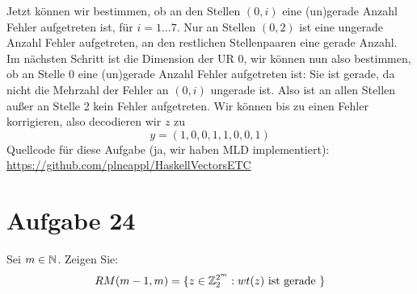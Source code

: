 Jetzt können wir bestimmen, ob an den Stellen $(0, i)$ eine (un)gerade Anzahl Fehler aufgetreten ist, für $i=1\ldots 7$. Nur an Stellen $(0, 2)$ ist eine ungerade Anzahl Fehler aufgetreten, an den restlichen Stellenpaaren eine gerade Anzahl.\\
Im nächsten Schritt ist die Dimension der UR 0, wir können nun also bestimmen, ob an Stelle 0 eine (un)gerade Anzahl Fehler aufgetreten ist: Sie ist gerade, da nicht die Mehrzahl der Fehler an $(0, i)$ ungerade ist. Also ist an allen Stellen außer an Stelle 2 kein Fehler aufgetreten. Wir können bis zu einen Fehler korrigieren, also decodieren wir $z$ zu $$y = (1, 0, 0, 1, 1, 0, 0, 1)$$
Quellcode für diese Aufgabe (ja, wir haben MLD implementiert): \url{https://github.com/plneappl/HaskellVectorsETC}

\section*{Aufgabe 24}
Sei $m \in \mathbb{N}$. Zeigen Sie:
\begin{equation*}
	RM(m-1,m) = \lbrace z \in \mathbb{Z}^{2^m}_2 : wt(z) \text{ ist gerade } \rbrace
\end{equation*}

